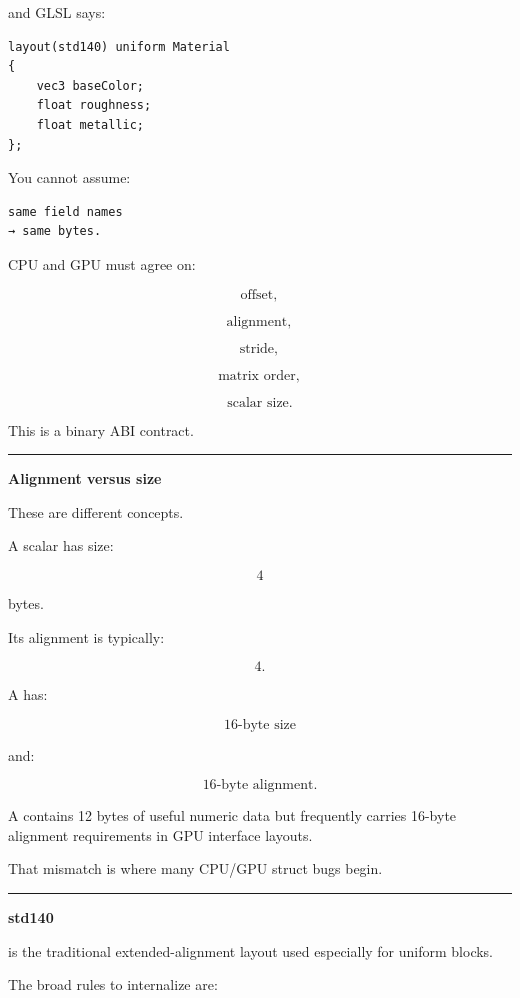 and GLSL says:

\begin{verbatim}
layout(std140) uniform Material
{
    vec3 baseColor;
    float roughness;
    float metallic;
};
\end{verbatim}

You cannot assume:

\begin{verbatim}
same field names
→ same bytes.
\end{verbatim}

CPU and GPU must agree on:

\[
\text{offset},
\]

\[
\text{alignment},
\]

\[
\text{stride},
\]

\[
\text{matrix order},
\]

\[
\text{scalar size}.
\]

This is a binary ABI contract.

\begin{center}\rule{0.5\linewidth}{0.5pt}\end{center}

\textbf{Alignment versus size}

These are different concepts.

A scalar  has size:

\[
4
\]

bytes.

Its alignment is typically:

\[
4.
\]

A  has:

\[
16\text{-byte size}
\]

and:

\[
16\text{-byte alignment}.
\]

A  contains 12 bytes of useful numeric data but frequently carries 16-byte alignment requirements in GPU interface layouts.

That mismatch is where many CPU/GPU struct bugs begin.

\begin{center}\rule{0.5\linewidth}{0.5pt}\end{center}

\textbf{std140}

 is the traditional extended-alignment layout used especially for uniform blocks.

The broad rules to internalize are:

